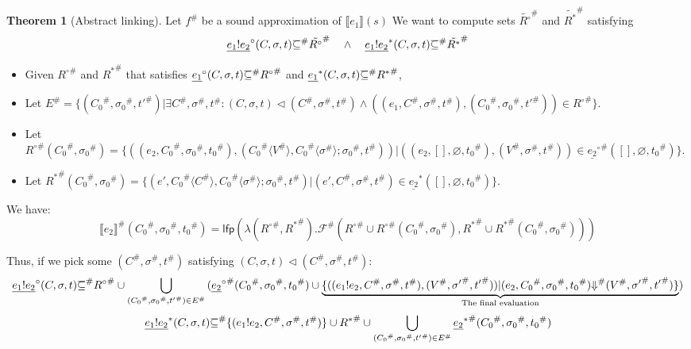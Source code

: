 \documentclass{article}
\theoremstyle{definition}
\newtheorem{thm}{Theorem}[section]
\def\ovbarw{1.2mu}
\def\ovbarh{0.8}
\newcommand*{\ovbar}[1]{\mkern \ovbarw\overline{\mkern-\ovbarw{\smash{#1}\scalebox{1}[\ovbarh]{\vphantom{i}}}\mkern-\ovbarw}\mkern \ovbarw}
\newcommand*{\A}[1]{{#1}^{\#}}
\newcommand*{\link}[2]{{#1}\mathtt{!}{#2}}
\newcommand*{\Reach}[1]{\underline{#1}^{*}}
\newcommand*{\Resolved}[1]{\underline{#1}^{\circ}}
\newcommand*{\sembracket}[1]{\lBrack{#1}\rBrack}
\newcommand*{\inject}[2]{{#1}\langle{#2}\rangle}
\begin{document}
\begin{thm}[Abstract linking] Let $\A{f}$ be a sound approximation of $\sembracket{e_{1}}(s)$
  We want to compute sets $\tilde{R^{\circ}}^{\#}$ and $\tilde{R^{*}}^{\#}$ satisfying
  \[
    \Resolved{\link{e_1}{e_2}}(C,\sigma,t)\ovbar{\subseteq}^{\#} \tilde{R^{\circ}}^{\#}
    \quad\wedge\quad
    \Reach{\link{e_1}{e_2}}(C,\sigma,t)\ovbar{\subseteq}^{\#} \tilde{R^{*}}^{\#}
  \]

  \begin{itemize}
    \item Given ${R^{\circ}}^{\#}$ and ${R^{*}}^{\#}$ that satisfies $\Resolved{e_1}(C,\sigma,t)\ovbar{\subseteq}^{\#} {R^{\circ}}^{\#}$ and $\Reach{e_1}(C,\sigma,t)\ovbar{\subseteq}^{\#} {R^{*}}^{\#}$,
    \item Let $\A{E}=\{(\A{C_{0}},\A{\sigma_{0}},\A{t'})|\exists \A{C},\A{\sigma},\A{t}:(C,\sigma,t)\lhd(\A{C},\A{\sigma},\A{t})\wedge((e_{1},\A{C},\A{\sigma},\A{t}),(\A{C_{0}},\A{\sigma_{0}},\A{t'}))\in \A{R^{\circ}}\}$.
    \item Let $\A{R^{\circ}}(\A{C_{0}},\A{\sigma_{0}})=\{((e_{2},\A{C_{0}},\A{\sigma_{0}},\A{t_{0}}), (\inject{\A{C_{0}}}{\A{V}},\inject{\A{C_{0}}}{\A{\sigma}};\A{\sigma_{0}},\A{t}))|((e_{2},[],\varnothing,\A{t_{0}}),(\A{V},\A{\sigma},\A{t}))\in\A{\Resolved{e_{2}}}([],\varnothing,\A{t_{0}})\}$.
    \item Let $\A{R^{*}}(\A{C_{0}},\A{\sigma_{0}})=\{(e',\inject{\A{C_{0}}}{\A{C}},\inject{\A{C_{0}}}{\A{\sigma}};\A{\sigma_{0}},\A{t})|(e',\A{C},\A{\sigma},\A{t})\in\Reach{e_{2}}([],\varnothing,\A{t_{0}})\}$.
  \end{itemize}

  We have:
  \[
    \A{\sembracket{e_{2}}}(\A{C_{0}},\A{\sigma_{0}},\A{t_{0}})=\mathsf{lfp}(\lambda (\A{R^{\circ}}, \A{R^{*}}).\A{\mathcal{F}}(\A{R^{\circ}}\cup \A{R^{\circ}}(\A{C_{0}},\A{\sigma_{0}}), \A{R^{*}}\cup \A{R^{*}}(\A{C_{0}},\A{\sigma_{0}})))
  \]

  Thus, if we pick some $(\A{C},\A{\sigma},\A{t})$ satisfying $(C,\sigma,t)\lhd(\A{C},\A{\sigma},\A{t})$:
  \[
    \Resolved{\link{e_1}{e_2}}(C,\sigma,t)\A{\ovbar{\subseteq}}
    \A{R^{\circ}}\cup\bigcup_{(\A{C_{0}},\A{\sigma_{0}},\A{t'})\in \A{E}}{(\A{\Resolved{e_2}}(\A{C_{0}},\A{\sigma_{0}},\A{t_{0}})\cup\underbrace{\{((\link{e_1}{e_2}, \A{C}, \A{\sigma}, \A{t}), (\A{V},\A{\sigma'},\A{t'}))|(e_{2},\A{C_{0}},\A{\sigma_{0}},\A{t_{0}})\A{\Downarrow}(\A{V},\A{\sigma'},\A{t'})\}}_{\text{The final evaluation}})}
  \]
  \begin{align*}
    \Reach{\link{e_1}{e_2}}(C,\sigma,t)\A{\ovbar{\subseteq}}\{(\link{e_1}{e_2},\A{C},\A{\sigma},\A{t})\}\cup \A{R^{*}}\cup\bigcup_{(\A{C_{0}},\A{\sigma_{0}},\A{t'})\in \A{E}}{\A{\Reach{e_2}}(\A{C_{0}},\A{\sigma_{0}},\A{t_{0}})}
  \end{align*}
\end{thm}
\end{document}
